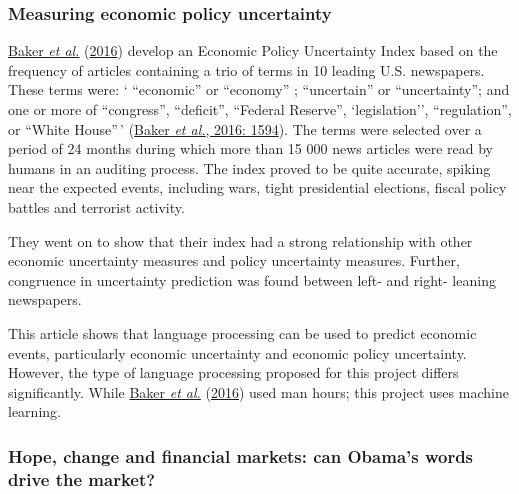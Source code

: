 \documentclass[11pt,preprint, authoryear]{elsarticle}
\numberwithin{equation}{section}
\numberwithin{figure}{section}
\numberwithin{table}{section}
\begin{document}
\hypertarget{measuring-economic-policy-uncertainty}{%
\subsubsection{\texorpdfstring{Measuring economic policy uncertainty
\label{policy uncertainty}}{Measuring economic policy uncertainty }}\label{measuring-economic-policy-uncertainty}}

\protect\hyperlink{ref-baker2016measuring}{Baker \emph{et al.}}
(\protect\hyperlink{ref-baker2016measuring}{2016}) develop an Economic
Policy Uncertainty Index based on the frequency of articles containing a
trio of terms in 10 leading U.S. newspapers. These terms were: `
``economic'' or ``economy'' ; ``uncertain'' or ``uncertainty''; and one
or more of ``congress'', ``deficit'', ``Federal Reserve'',
`legislation'', ``regulation'', or ``White House''\,'
(\protect\hyperlink{ref-baker2016measuring}{Baker \emph{et al.}, 2016:
1594}). The terms were selected over a period of 24 months during which
more than 15 000 news articles were read by humans in an auditing
process. The index proved to be quite accurate, spiking near the
expected events, including wars, tight presidential elections, fiscal
policy battles and terrorist activity.

They went on to show that their index had a strong relationship with
other economic uncertainty measures and policy uncertainty measures.
Further, congruence in uncertainty prediction was found between left-
and right- leaning newspapers.

This article shows that language processing can be used to predict
economic events, particularly economic uncertainty and economic policy
uncertainty. However, the type of language processing proposed for this
project differs significantly. While
\protect\hyperlink{ref-baker2016measuring}{Baker \emph{et al.}}
(\protect\hyperlink{ref-baker2016measuring}{2016}) used man hours; this
project uses machine learning.

\hypertarget{hope-change-and-financial-markets-can-obamas-words-drive-the-market}{%
\subsubsection{\texorpdfstring{Hope, change and financial markets: can
Obama's words drive the market?
\label{Obama}}{Hope, change and financial markets: can Obama's words drive the market? }}\label{hope-change-and-financial-markets-can-obamas-words-drive-the-market}}
\end{document}
